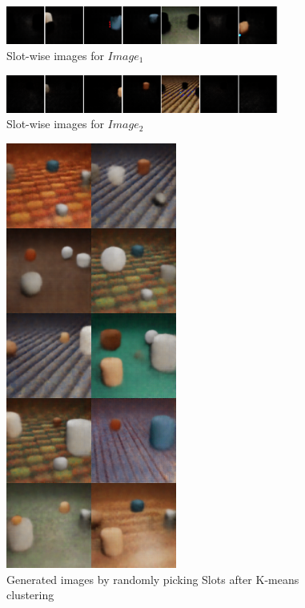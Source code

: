 \begin{figure}[hbt!]
    \centering
    \includegraphics[width=0.8\textwidth]{images/slots_images_1.png} 
    \caption{Slot-wise images for $Image_1$}
    \label{fig:slot_images1}
\end{figure}

\begin{figure}[hbt!]
    \centering
    \includegraphics[width=0.8\textwidth]{images/slots_images_2.png} 
    \caption{Slot-wise images for $Image_2$}
    \label{fig:slot_images2}
\end{figure}


\begin{figure}[hbt!]
    \centering
    \includegraphics[width=0.5\textwidth]{images/generated_iamges.png} 
    \caption{Generated images by randomly picking Slots after K-means clustering}
    \label{fig:generated_iamges}
\end{figure}